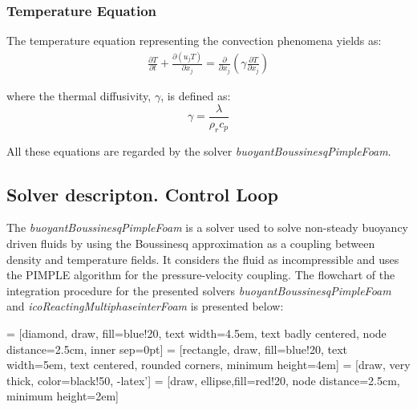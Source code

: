 \subsubsection{Temperature Equation}
\setlength{\parindent}{0.5cm} The temperature equation representing the convection phenomena yields as:
\begin{equation}
	\begin{aligned}
	\frac{\partial T}{\partial t}+ \frac{\partial (u_{j} T)}{\partial x_{j}}=\frac{\partial}{\partial x_{j}}\left(\gamma \frac{\partial T}{\partial x_{j}}\right)
	\end{aligned}
	\label{3.12}
\end{equation}

where the thermal diffusivity, $\gamma$, is defined as:
\begin{equation}
	\gamma=\frac{\lambda}{\rho_{r} c_{p}}
	\label{3.13}
\end{equation}

All these equations are regarded by the solver \textit{buoyantBoussinesqPimpleFoam}.

\subsection{Solver descripton. Control Loop}

\setlength{\parindent}{0.5cm} The \textit{buoyantBoussinesqPimpleFoam} is a solver used to solve non-steady buoyancy driven fluids by using the Boussinesq approximation as a coupling between density and temperature fields. It considers the fluid as incompressible and uses the PIMPLE algorithm for the pressure-velocity coupling. The flowchart of the integration procedure for the presented solvers \textit{buoyantBoussinesqPimpleFoam} and \textit{icoReactingMultiphaseinterFoam} is presented below:

 = [diamond, draw, fill=blue!20,
text width=4.5em, text badly centered, node distance=2.5cm, inner sep=0pt]
 = [rectangle, draw, fill=blue!20,
text width=5em, text centered, rounded corners, minimum height=4em]
 = [draw, very thick, color=black!50, -latex']
 = [draw, ellipse,fill=red!20, node distance=2.5cm,
minimum height=2em]

